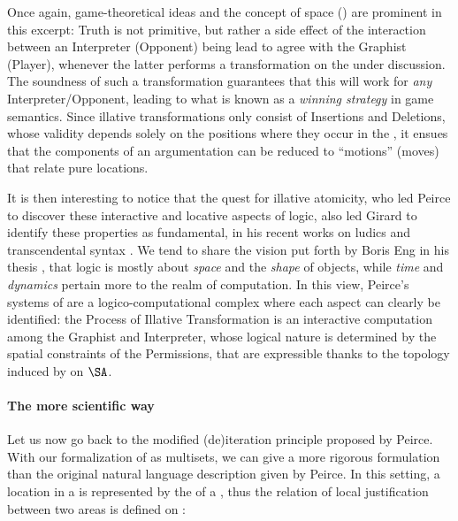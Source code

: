 \begin{scope}
\begin{scope}
Once again, game-theoretical ideas and the concept of space
() are prominent in this excerpt: Truth is not primitive,
but rather a side effect of the interaction between an Interpreter (Opponent)
being lead to agree with the Graphist (Player), whenever the latter performs a
transformation on the  under discussion. The soundness of such a
transformation guarantees that this will work for \emph{any}
Interpreter/Opponent, leading to what is known as a \emph{winning strategy} in
game semantics. Since illative transformations only consist of Insertions and
Deletions, whose validity depends solely on the positions where they occur in
the , it ensues that the components of an argumentation can be reduced to
``motions'' (moves) that relate pure locations.

It is then interesting to notice that the quest for illative atomicity, who led
Peirce to discover these interactive and locative aspects of logic, also led
Girard to identify these properties as fundamental, in his recent works on
ludics \cite{girard_locus_2001} and transcendental syntax
\cite{eng_exegesis_2023}. We tend to share the vision put forth by Boris Eng in
his thesis \cite[\S 24.4]{eng_exegesis_2023}, that logic is mostly about
\emph{space} and the \emph{shape} of objects, while \emph{time} and
\emph{dynamics} pertain more to the realm of computation. In this view, Peirce's
systems of  are a logico-computational complex where each aspect can clearly
be identified: the Process of Illative Transformation is an interactive
computation among the Graphist and Interpreter, whose logical nature is
determined by the spatial constraints of the Permissions, that are expressible
thanks to the topology induced by  on $\SA$.

\paragraph{The more scientific way}

Let us now go back to the modified (de)iteration principle proposed by Peirce.
With our formalization of  as multisets, we can give a more rigorous
formulation than the original natural language description given by
Peirce. In this setting, a location in a  is represented by the
 of a , thus the relation of local justification between two areas is
defined on :


\end{scope}
\end{scope}

